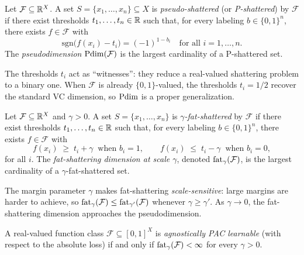 \begin{defn}[Pseudodimension]
\label{def:pseudodim}
Let $\mathcal{F} \subseteq \mathbb{R}^X$.  A set $S = \{x_1, \ldots, x_n\} \subseteq X$
is \emph{pseudo-shattered} (or \emph{P-shattered}) by $\mathcal{F}$ if there
exist thresholds $t_1, \ldots, t_n \in \mathbb{R}$ such that, for every labeling
$b \in \{0,1\}^n$, there exists $f \in \mathcal{F}$ with
\[
  \mathrm{sgn}\bigl(f(x_i) - t_i\bigr) = (-1)^{1 - b_i}
  \quad \text{for all } i = 1, \ldots, n.
\]
The \emph{pseudodimension} $\mathrm{Pdim}(\mathcal{F})$ is the largest cardinality of
a P-shattered set.
\end{defn}

The thresholds $t_i$ act as ``witnesses'': they reduce a real-valued
shattering problem to a binary one.  When $\mathcal{F}$ is already
$\{0,1\}$-valued, the thresholds $t_i = 1/2$ recover the standard VC
dimension, so $\mathrm{Pdim}$ is a proper generalization.

\begin{defn}
\label{def:fat-shattering}
Let $\mathcal{F} \subseteq \mathbb{R}^X$ and $\gamma > 0$.  A set
$S = \{x_1, \ldots, x_n\}$ is \emph{$\gamma$-fat-shattered} by $\mathcal{F}$
if there exist thresholds $t_1, \ldots, t_n \in \mathbb{R}$ such that, for every
labeling $b \in \{0,1\}^n$, there exists $f \in \mathcal{F}$ with
\[
  f(x_i) \;\geq\; t_i + \gamma \;\;\text{when } b_i = 1,
  \qquad
  f(x_i) \;\leq\; t_i - \gamma \;\;\text{when } b_i = 0,
\]
for all $i$.  The \emph{fat-shattering dimension at scale $\gamma$}, denoted
$\mathrm{fat}_\gamma(\mathcal{F})$, is the largest cardinality of a
$\gamma$-fat-shattered set.
\end{defn}

The margin parameter $\gamma$ makes fat-shattering \emph{scale-sensitive}:
large margins are harder to achieve, so
$\mathrm{fat}_\gamma(\mathcal{F}) \leq \mathrm{fat}_{\gamma'}(\mathcal{F})$ whenever
$\gamma \geq \gamma'$.  As $\gamma \to 0$, the fat-shattering dimension
approaches the pseudodimension.

\begin{thm}
\label{thm:fat-char}
A real-valued function class $\mathcal{F} \subseteq [0,1]^X$ is
\emph{agnostically PAC learnable} (with respect to the absolute loss) if and
only if $\mathrm{fat}_\gamma(\mathcal{F}) < \infty$ for every $\gamma > 0$.
\end{thm}

